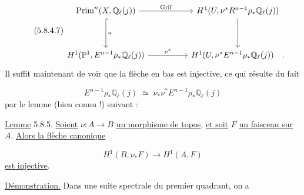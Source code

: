 \begin{equation}\tag{5.8.4.7}
\begin{tikzcd}[column sep=huge, row sep=huge]
\mathrm{Prim}^n(X,\mathbb{Q}_\ell(j)) \arrow[r, "\mathrm{Grif}"] \arrow[d, hook, "u"] & H^1(U,\nu^*R^{n-1}\rho_*\mathbb{Q}_\ell(j)) \arrow[d] \\
H^1(\mathbb{P}^1,E^{n-1}\rho_*\mathbb{Q}_\ell(j)) \arrow[r, "\nu^*"] & H^1(U,\nu^*E^{n-1}\rho_*\mathbb{Q}_\ell(j)) \quad .
\end{tikzcd}
\end{equation}
Il suffit maintenant de voir que la flèche en bas est injective, ce qui résulte du fait

\begin{equation}\tag{5.8.4.8}
E^{n-1}\rho_*\mathbb{Q}_\ell(j) \;\simeq\; \nu_*\nu^*E^{n-1}\rho_*\mathbb{Q}_\ell(j)
\end{equation}
par le lemme (bien connu !) suivant :

\underline{Lemme} 5.8.5. \underline{Soient} $\nu : A \longrightarrow B$ \underline{un morphisme de topos}, \underline{et soit} $F$ \underline{un faisceau sur} $A$. \underline{Alors la flèche canonique}

\begin{equation}\tag{5.8.5.1}
H^1(B,\nu_*F) \longrightarrow H^1(A,F)
\end{equation}
\underline{est injective}.

\underline{Démonstration.} Dans une suite spectrale du premier quadrant, on a

